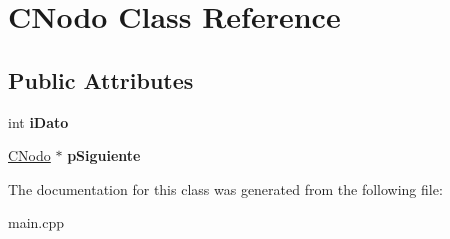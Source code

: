 \hypertarget{class_c_nodo}{
\section{\-C\-Nodo \-Class \-Reference}
\label{class_c_nodo}
}
\subsection*{\-Public \-Attributes}
\begin{DoxyCompactItemize}
\item 
\hypertarget{class_c_nodo_af343b1f6cf3a121ad55cd6dd79e68648}{
int {\bfseries i\-Dato}}
\label{class_c_nodo_af343b1f6cf3a121ad55cd6dd79e68648}

\item 
\hypertarget{class_c_nodo_aa710377cd226202a6144639a4ce2fd3f}{
\hyperlink{class_c_nodo}{\-C\-Nodo} $\ast$ {\bfseries p\-Siguiente}}
\label{class_c_nodo_aa710377cd226202a6144639a4ce2fd3f}

\end{DoxyCompactItemize}


\-The documentation for this class was generated from the following file\-:\begin{DoxyCompactItemize}
\item 
main.\-cpp\end{DoxyCompactItemize}
